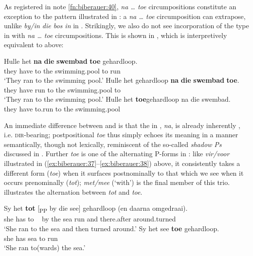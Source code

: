\documentclass[output=paper]{LSP/langsci}
\begin{document}
As registered in note \ref{fn:biberauer:40}, \textit{na … toe} circumpositions constitute an exception to the pattern illustrated in : a \textit{na … toe} circumposition can extrapose, unlike \textit{by/in die bos in} in . Strikingly, we also do not see incorporation of the type in  with \textit{na … toe} circumpositions. This is shown in , which is interpretively equivalent to  above:



\ea%
    \label{ex:biberauer:49}
	  \ea  \label{ex:biberauer:49a}
\gll Hulle het    \textbf{na} \textbf{die} \textbf{swembad} \textbf{toe}  gehardloop.\\
    they   have to  the swimming.pool to    run\\
  \glt ‘They ran to the swimming pool.’
 \ex \label{ex:biberauer:49b}
\gll   Hulle het   gehardloop \textbf{na} \textbf{die} \textbf{swembad} \textbf{toe}.\\
    they   have run             to  the  swimming.pool to\\
  \glt ‘They ran to the swimming pool.’
 \ex \label{ex:biberauer:49c}
\gll   *Hulle het    \textbf{toe}gehardloop na die swembad.\\
      they   have to.run               to  the swimming.pool\\
\z
\z



An immediate difference between  and  is that the  in , \textit{na}, is already inherently , i.e. \textsc{dir}{}-bearing; postpositional \textit{toe} thus simply echoes its  meaning in a manner semantically, though not lexically, reminiscent of the so-called  \textit{shadow Ps} discussed in \citet{Noonan2010}. Further \textit{toe} is one of the alternating P-forms in : like \textit{vir/voor} illustrated in (\ref{ex:biberauer:37}--\ref{ex:biberauer:38}) above, it consistently takes a different form (\textit{toe}) when it surfaces postnominally to that which we see when it occurs prenominally (\textit{tot});\textit{ met/mee} (‘with’) is the final member of this trio.  illustrates the alternation between \textit{tot} and \textit{toe}.



\ea%
    \label{ex:biberauer:50}
     \ea\label{ex:biberauer:50a}
\gll  Sy  het \textbf{tot} [\textsubscript{PP} by die see] gehardloop (en    daarna       omgedraai).\\
    she has to   ~    by the sea   run               {\db}and  there.after around.turned\\
  \glt ‘She ran to the sea and then turned around.’
 \ex\label{ex:biberauer:50b}
\gll  Sy  het  see \textbf{toe} gehardloop.\\
    she has sea to    run \\
  \glt ‘She ran to(wards) the sea.’
\z
\z
\end{document}
